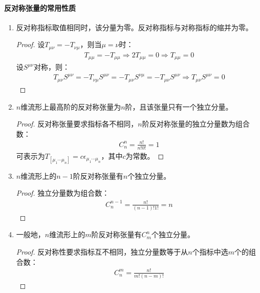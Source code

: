     \paragraph{反对称张量的常用性质}
        \begin{enumerate}[label=(\arabic*)]
          \item 反对称指标取值相同时，该分量为零。反对称指标与对称指标的缩并为零。
          
          \begin{proof}
          设$T_{\mu\nu} = -T_{\nu\mu}$，则当$\mu = \nu$时：
          \begin{align}
          T_{\mu\mu} = -T_{\mu\mu} \Rightarrow 2T_{\mu\mu} = 0 \Rightarrow T_{\mu\mu} = 0
          \end{align}
          设$S^{\mu\nu}$对称，则：
          \begin{align}
          T_{\mu\nu}S^{\mu\nu} = -T_{\nu\mu}S^{\mu\nu} = -T_{\mu\nu}S^{\nu\mu} = -T_{\mu\nu}S^{\mu\nu} \Rightarrow T_{\mu\nu}S^{\mu\nu} = 0
          \end{align}
          \end{proof}

          \item $n$维流形上最高阶的反对称张量为$n$阶，且该张量只有一个独立分量。
          
          \begin{proof}
          反对称张量要求指标各不相同，$n$阶反对称张量的独立分量数为组合数：
          \begin{align}
          C_n^n = \frac{n!}{n!0!} = 1
          \end{align}
          可表示为$T_{[\mu_1\cdots\mu_n]} = c\epsilon_{\mu_1\cdots\mu_n}$，其中$c$为常数。
          \end{proof}

          \item $n$维流形上的$n-1$阶反对称张量有$n$个独立分量。
          
          \begin{proof}
          独立分量数为组合数：
          \begin{align}
          C_{n}^{n-1} = \frac{n!}{(n-1)!1!} = n
          \end{align}
          \end{proof}

          \item 一般地，$n$维流形上的$m$阶反对称张量有$C_m^n$个独立分量。
          
          \begin{proof}
          反对称性要求指标互不相同，独立分量数等于从$n$个指标中选$m$个的组合数：
            \begin{align}
            C_n^m = \frac{n!}{m!(n-m)!}
            \end{align}
          \end{proof}
        \end{enumerate}

